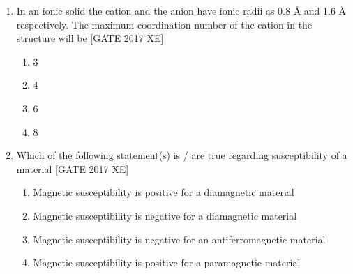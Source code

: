\documentclass[journal,12pt,onecolumn]{IEEEtran}
\theoremstyle{remark}
\begin{document}
\begin{enumerate}
\item In an ionic solid the cation and the anion have ionic radii as 0.8 Å and 1.6 Å respectively. The maximum coordination number of the cation in the structure will be
\hfill [GATE 2017 XE]
\begin{multicols}{2}
\begin{enumerate}
    \item 3
    \item 4
    \item 6
    \item 8
\end{enumerate}
\end{multicols}




\item Which of the following statement(s) is / are true regarding susceptibility of a material
\hfill [GATE 2017 XE]
\begin{enumerate}[label=(\roman*)]
    \item Magnetic susceptibility is positive for a diamagnetic material
    \item Magnetic susceptibility is negative for a diamagnetic material
    \item Magnetic susceptibility is negative for an antiferromagnetic material
    \item Magnetic susceptibility is positive for a paramagnetic material
\end{enumerate}


\end{enumerate}
\end{document}
